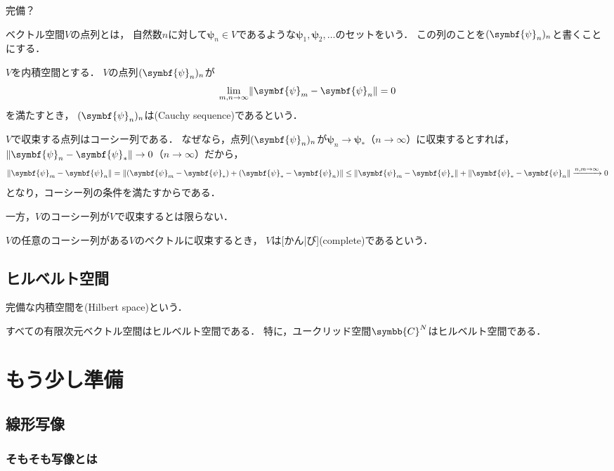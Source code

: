 \documentclass[
]{sotsu}
\newcommand{\bpsi}{\symbf{\psi}}
\begin{document}
完備？

ベクトル空間$V$の点列とは，
自然数$n$に対して$\bpsi_n \in V$であるような$\bpsi_1, \bpsi_2, \dots$のセットをいう．
この列のことを$\sequ{\bpsi_n}[n]$と書くことにする．

$V$を内積空間とする．
$V$の点列$\sequ{\bpsi_n}[n]$が
\begin{equation*}
    \lim_{m, n \to \infty} \norm{\bpsi_m - \bpsi_n} = 0
\end{equation*}
を満たすとき，
$\sequ{\bpsi_n}[n]$は(Cauchy sequence)であるという．

$V$で収束する点列はコーシー列である．
なぜなら，点列$\sequ{\bpsi_n}[n]$が$\bpsi_n \to \bpsi_*$（$n \to \infty$）に収束するとすれば，
$\norm{\bpsi_n - \bpsi_*} \to 0$（$n \to \infty$）だから，
\begin{equation*}
    \norm{\bpsi_m - \bpsi_n}
    = \norm{(\bpsi_m - \bpsi_*) + (\bpsi_* - \bpsi_n)}
    \leq \norm{\bpsi_m - \bpsi_*} + \norm{\bpsi_* - \bpsi_n}
    \xrightarrow{n, m \to \infty} 0
\end{equation*}
となり，コーシー列の条件を満たすからである．

一方，$V$のコーシー列が$V$で収束するとは限らない．

$V$の任意のコーシー列がある$V$のベクトルに収束するとき，
$V$は[かん|び](complete)であるという．





\subsection{ヒルベルト空間}

完備な内積空間を(Hilbert space)という．

すべての有限次元ベクトル空間はヒルベルト空間である．
特に，ユークリッド空間$\symbb{C}^N$はヒルベルト空間である．




\section{もう少し準備}

\subsection{線形写像}

\subsubsection{そもそも写像とは}
\end{document}
